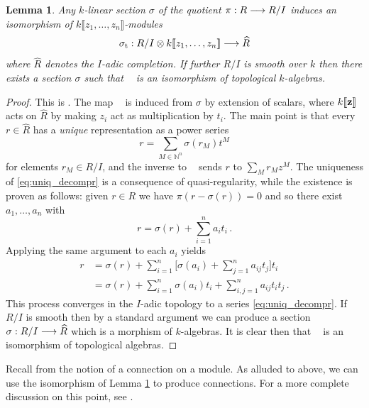 \documentclass[english,letter paper,12pt,leqno]{article}
\newtheorem{lemma}[theorem]{Lemma}
\theoremstyle{example}
\numberwithin{equation}{section}
\def\be{\begin{equation}}
\def\ee{\end{equation}}
\DeclareMathOperator{\sigmastar}{\sigma_t}
\begin{document}
\begin{lemma}\label{prop_algtube} Any $k$-linear section $\sigma$ of the quotient $\pi: R \longrightarrow R/I$ induces an isomorphism of $k\llbracket z_1,\ldots,z_n \rrbracket$-modules
\[
\sigmastar: R/I \otimes k\llbracket z_1,\ldots,z_n \rrbracket \lto \widehat{R}
\]
where $\widehat{R}$ denotes the $I$-adic completion. If further $R/I$ is smooth over $k$ then there exists a section $\sigma$ such that $\sigmastar$ is an isomorphism of topological $k$-algebras.
\end{lemma}
\begin{proof}
This is \cite[Lemma 3.3.2]{lipman}. The map $\sigmastar$ is induced from $\sigma$ by extension of scalars, where $k\llbracket \bold{z} \rrbracket$ acts on $\widehat{R}$ by making $z_i$ act as multiplication by $t_i$. The main point is that every $r \in \widehat{R}$ has a \emph{unique} representation as a power series
\be\label{eq:uniq_decompr}
r = \sum_{M \in \mathbb{N}^n} \sigma(r_M) t^M
\ee
for elements $r_M \in R/I$, and the inverse to $\sigmastar$ sends $r$ to $\sum_M r_M z^M$. The uniqueness of \eqref{eq:uniq_decompr} is a consequence of quasi-regularity, while the existence is proven as follows: given $r \in R$ we have $\pi( r - \sigma(r) ) = 0$ and so there exist $a_1,\ldots,a_n$ with
\be\label{eq:uniq_decompr_choices}
r = \sigma(r) + \sum_{i=1}^n a_i t_i\,.
\ee
Applying the same argument to each $a_i$ yields %
\begin{align*}
r &= \sigma(r) + \sum_{i=1}^n \big[ \sigma(a_i) + \sum_{j=1}^n a_{ij} t_j \big] t_i\\
&= \sigma(r) + \sum_{i=1}^n \sigma(a_i) t_i + \sum_{i,j=1}^n a_{ij} t_i t_j\,.
\end{align*}
This process converges in the $I$-adic topology to a series \eqref{eq:uniq_decompr}. If $R/I$ is smooth then by a standard argument \cite{matsumura} we can produce a section $\sigma: R/I \longrightarrow \widehat{R}$ which is a morphism of $k$-algebras. It is clear then that $\sigmastar$ is an isomorphism of topological algebras.
\end{proof}

Recall from \cite[\S 8.1.1]{loday} the notion of a connection on a module. As alluded to above, we can use the isomorphism of Lemma \ref{prop_algtube} to produce connections. For a more complete discussion on this point, see \cite[Appendix B]{pushforward}.
\end{document}
